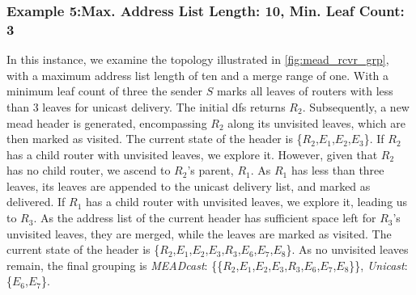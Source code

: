 \subsubsection{Example 5:\quad Max. Address List Length: 10, Min. Leaf Count: 3}
\label{sec:Max 10 Min Leaf 3}
In this instance, we examine the topology illustrated in \autoref{fig:mead_rcvr_grp},
    with a maximum address list length of ten and a merge range of one.
With a minimum leaf count of three the sender $S$ marks all leaves of routers with
    less than 3 leaves for unicast delivery.
The initial \gls{dfs} returns $R_2$.
Subsequently, a new \gls{mead} header is generated, encompassing $R_2$ along its
    unvisited leaves, which are then marked as visited.
The current state of the header is \{$R_2$,$E_1$,$E_2$,$E_3$\}.
If $R_2$ has a child router with unvisited leaves, we explore it.
However, given that $R_2$ has no child router, we ascend to $R_2$'s parent, $R_1$.
As $R_1$ has less than three leaves, its leaves are appended to the unicast
    delivery list, and marked as delivered.
If $R_1$ has a child router with unvisited leaves, we explore it, leading us to
    $R_3$.
As the address list of the current header has sufficient space left for $R_3$'s
    unvisited leaves, they are merged, while the leaves are marked as visited.
The current state of the header is
    \{$R_2$,$E_1$,$E_2$,$E_3$,$R_3$,$E_6$,$E_7$,$E_8$\}.
As no unvisited leaves remain, the final grouping is
    \textit{MEADcast}: \{\{$R_2$,$E_1$,$E_2$,$E_3$,$R_3$,$E_6$,$E_7$,$E_8$\}\},
    \textit{Unicast}: \{$E_6$,$E_7$\}.



